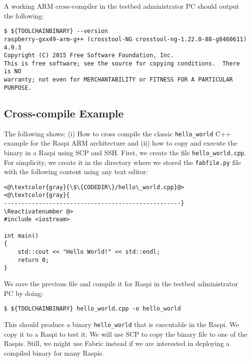 A working ARM cross-compiler in the testbed administrator \ac{PC} should
output the following:

\begin{lstlisting}[]
$ ${TOOLCHAINBINARY} --version
raspberry-gxx49-arm-g++ (crosstool-NG crosstool-ng-1.22.0-88-g8460611) 4.9.3
Copyright (C) 2015 Free Software Foundation, Inc.
This is free software; see the source for copying conditions.  There is NO
warranty; not even for MERCHANTABILITY or FITNESS FOR A PARTICULAR PURPOSE.
\end{lstlisting}
\FloatBarrier
\vspace{-5mm}

\subsection{Cross-compile Example}
The following shows: (i) How to cross compile the classic \texttt{hello\_world}
C++ example for the \ac{Raspi} ARM architecture and (ii) how to copy and
execute the binary in a \ac{Raspi} using \ac{SCP} and \ac{SSH}. First, we
create the file \texttt{hello\_world.cpp}. For simplicity, we create it
in the directory where we stored the \texttt{fabfile.py} file
with the following content using any text editor:

\Suppressnumber\begin{lstlisting}[]
<@\textcolor{gray}{\$\{CODEDIR\}/hello\_world.cpp}@>
<@\textcolor{gray}{
---------------------------------------------------}
\Reactivatenumber @>
#include <iostream>

int main()
{
    std::cout << "Hello World!" << std::endl;
    return 0;
}
\end{lstlisting}
\FloatBarrier
\vspace{-5mm}

We save the previous file and compile it for \ac{Raspi} in the testbed
administrator \ac{PC} by doing:

\begin{lstlisting}[]
$ ${TOOLCHAINBINARY} hello_world.cpp -o hello_world
\end{lstlisting}
\FloatBarrier
\vspace{-5mm}

This should produce a binary \texttt{hello\_world} that is executable
in the \ac{Raspi}. We copy it to a \ac{Raspi} to test it. We will
use \ac{SCP} to copy the binary file to one of the \ac{Raspi}s.
Still, we might use Fabric instead if we are interested in deploying
a compiled binary for many \ac{Raspi}s.

